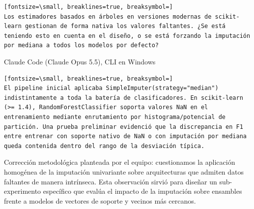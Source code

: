 \documentclass[12pt,a4paper,oneside]{book}
\begin{document}
\begin{iaprompt}
\begin{Verbatim}[fontsize=\small, breaklines=true, breaksymbol=]
Los estimadores basados en árboles en versiones modernas de scikit-learn gestionan de forma nativa los valores faltantes. ¿Se está teniendo esto en cuenta en el diseño, o se está forzando la imputación por mediana a todos los modelos por defecto?
\end{Verbatim}
\end{iaprompt}
\begin{iaresp}{Claude Code (Claude Opus 5.5), CLI en Windows}
\begin{Verbatim}[fontsize=\small, breaklines=true, breaksymbol=]
El pipeline inicial aplicaba SimpleImputer(strategy="median") indistintamente a toda la batería de clasificadores. En scikit-learn (>= 1.4), RandomForestClassifier soporta valores NaN en el entrenamiento mediante enrutamiento por histograma/potencial de partición. Una prueba preliminar evidenció que la discrepancia en F1 entre entrenar con soporte nativo de NaN o con imputación por mediana queda contenida dentro del rango de la desviación típica.
\end{Verbatim}
\end{iaresp}
\begin{iaanalisis}
Corrección metodológica planteada por el equipo: cuestionamos la aplicación homogénea de la imputación univariante sobre arquitecturas que admiten datos faltantes de manera intrínseca. Esta observación sirvió para diseñar un sub-experimento específico que evalúa el impacto de la imputación sobre ensambles frente a modelos de vectores de soporte y vecinos más cercanos.
\end{iaanalisis}
\end{document}
